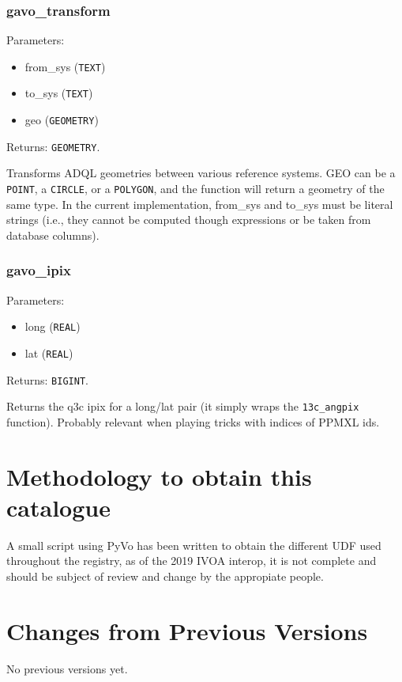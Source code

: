 \documentclass[11pt,a4paper]{ivoa}
\begin{document}
\subsubsection{gavo\_transform}

Parameters:

\begin{itemize}
	\item from\_sys (\texttt{TEXT})
	\item to\_sys (\texttt{TEXT})
	\item geo (\texttt{GEOMETRY})
\end{itemize}

Returns: \texttt{GEOMETRY}.

Transforms ADQL geometries between various reference systems. GEO can be
a \texttt{POINT}, a \texttt{CIRCLE}, or a \texttt{POLYGON}, and the
function will return a geometry of the same type. In the current
implementation, from\_sys and to\_sys must be literal strings (i.e.,
they cannot be computed though expressions or be taken from database
columns).

\subsubsection{gavo\_ipix}

Parameters:

\begin{itemize}
	\item long (\texttt{REAL})
	\item lat (\texttt{REAL})
\end{itemize}

Returns: \texttt{BIGINT}.

Returns the q3c ipix for a long/lat pair (it simply wraps the
\texttt{13c\_angpix} function). Probably relevant when playing tricks
with indices of PPMXL ids.

\appendix

\section{Methodology to obtain this catalogue}

A small script using PyVo has been written to obtain the different UDF
used throughout the registry, as of the 2019 IVOA interop, it is not
complete and should be subject of review and change by the appropiate
people.

\section{Changes from Previous Versions}

No previous versions yet.  



\end{document}
